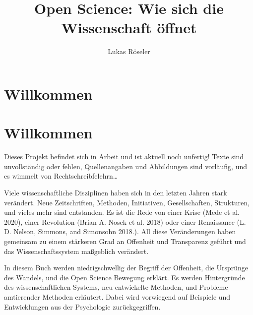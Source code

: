 \documentclass[
  letterpaper,
  DIV=11,
  numbers=noendperiod]{scrreprt}
\title{Open Science: Wie sich die Wissenschaft öffnet}
\author{Lukas Röseler}
\date{}
\renewcommand*\contentsname{Table of contents}
\newcommand\contentsname{Table of contents}
\begin{document}
\maketitle

\renewcommand*\contentsname{Table of contents}
{
\hypersetup{linkcolor=}
\setcounter{tocdepth}{2}
\tableofcontents
}


\chapter{Willkommen}\label{willkommen}


\chapter*{Willkommen}\label{willkommen-1}


\begin{tcolorbox}[enhanced jigsaw, title=\textcolor{quarto-callout-caution-color}{\faFire}\hspace{0.5em}{Warnung}, colbacktitle=quarto-callout-caution-color!10!white, rightrule=.15mm, titlerule=0mm, left=2mm, bottomrule=.15mm, arc=.35mm, leftrule=.75mm, toprule=.15mm, opacityback=0, breakable, bottomtitle=1mm, colframe=quarto-callout-caution-color-frame, toptitle=1mm, opacitybacktitle=0.6, coltitle=black, colback=white]

Dieses Projekt befindet sich in Arbeit und ist aktuell noch unfertig!
Texte sind unvollständig oder fehlen, Quellenangaben und Abbildungen
sind vorläufig, und es wimmelt von Rechtschreibfelehrn\ldots{}

\end{tcolorbox}

Viele wissenschaftliche Disziplinen haben sich in den letzten Jahren
stark verändert. Neue Zeitschriften, Methoden, Initiativen,
Gesellschaften, Strukturen, und vieles mehr sind entstanden. Es ist die
Rede von einer Krise (Mede et al. 2020), einer Revolution (Brian A.
Nosek et al. 2018) oder einer Renaissance (L. D. Nelson, Simmons, and
Simonsohn 2018.). All diese Veränderungen haben gemeinsam zu einem
stärkeren Grad an Offenheit und Transparenz geführt und das
Wissenschaftssystem maßgeblich verändert.

In diesem Buch werden niedrigschwellig der Begriff der Offenheit, die
Ursprünge des Wandels, und die Open Science Bewegung erklärt. Es werden
Hintergründe des wissenschaftlichen Systems, neu entwickelte Methoden,
und Probleme amtierender Methoden erläutert. Dabei wird vorwiegend auf
Beispiele und Entwicklungen aus der Psychologie zurückgegriffen.
\end{document}

